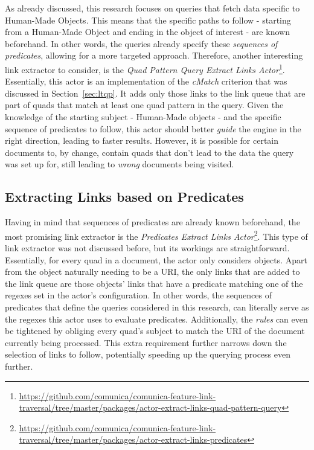 As already discussed, this research focuses on queries that fetch data specific to Human-Made Objects. This means that the specific paths to follow - starting from a Human-Made Object and ending in the object of interest - are known beforehand. In other words, the queries already specify these \textit{sequences of predicates}, allowing for a more targeted approach. Therefore, another interesting link extractor to consider, is the \textit{Quad Pattern Query Extract Links Actor}\footnote{\href{https://github.com/comunica/comunica-feature-link-traversal/tree/master/packages/actor-extract-links-quad-pattern-query}{https://github.com/comunica/comunica-feature-link-traversal/tree/master/packages/actor-extract-links-quad-pattern-query}}. Essentially, this actor is an implementation of the \textit{cMatch} criterion that was discussed in Section~\ref{sec:ltqp}. It adds only those links to the link queue that are part of quads that match at least one quad pattern in the query. Given the knowledge of the starting subject - Human-Made objects - and the specific sequence of predicates to follow, this actor should better \textit{guide} the engine in the right direction, leading to faster results. However, it is possible for certain documents to, by change, contain quads that don't lead to the data the query was set up for, still leading to \textit{wrong} documents being visited.

\subsection{Extracting Links based on Predicates}

Having in mind that sequences of predicates are already known beforehand, the most promising link extractor is the \textit{Predicates Extract Links Actor}\footnote{\href{https://github.com/comunica/comunica-feature-link-traversal/tree/master/packages/actor-extract-links-predicates}{https://github.com/comunica/comunica-feature-link-traversal/tree/master/packages/actor-extract-links-predicates}}. This type of link extractor was not discussed before, but its workings are straightforward. Essentially, for every quad in a document, the actor only considers objects. Apart from the object naturally needing to be a URI, the only links that are added to the link queue are those objects' links that have a predicate matching one of the regexes set in the actor's configuration. In other words, the sequences of predicates that define the queries considered in this research, can literally serve as the regexes this actor uses to evaluate predicates. Additionally, the \textit{rules} can even be tightened by obliging every quad's subject to match the URI of the document currently being processed. This extra requirement further narrows down the selection of links to follow, potentially speeding up the querying process even further.

